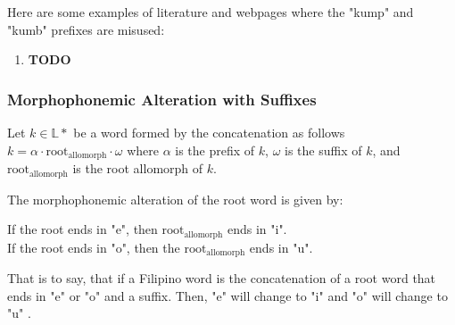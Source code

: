 \begin{example}
      Here are some examples of literature and webpages where the "kump" and "kumb"
      prefixes are misused:
\end{example}
\begin{enumerate}
      \item \textbf{TODO}
\end{enumerate}

\subsubsection{Morphophonemic Alteration with Suffixes}

Let \(k \in \mathbb{L}*\) be a word formed by the concatenation as follows
\(k = \alpha \cdot \text{root}_\text{allomorph} \cdot \omega \)
where  \(\alpha\) is the prefix of \(k\), \(\omega\) is the suffix of \(k\),
and \(\text{root}_\text{allomorph}\) is the root allomorph of \(k\).

The morphophonemic alteration of the root word is given by:
\begin{center}
      If the root ends in "e", then \(\text{root}_\text{allomorph}\) ends in "i". \\
      If the root ends in "o", then the \(\text{root}_\text{allomorph}\) ends in "u".
\end{center}

That is to say, that if a Filipino word is the concatenation of a root word that
ends in "e" or "o" and a suffix. Then, "e" will change to "i" and "o" will change
to "u" \cite{Yap_1967}.

